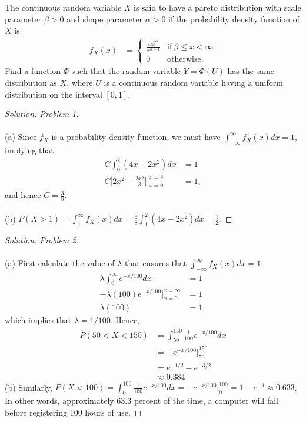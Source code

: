 \documentclass[10pt]{article}
\newenvironment{problem}[2][Problem]{\begin{trivlist}
\item[\hskip \labelsep {\bfseries #1}\hskip \labelsep {\bfseries #2.}]}{\end{trivlist}}
\begin{document}
\begin{problem}{10}
The continuous random variable $X$ is said to have a pareto distribution with scale parameter $\beta > 0$ and shape parameter $\alpha > 0$ if the probability density function of $X$ is
\begin{align*}
    f_X(x) &= 
    \begin{cases}
      \frac{\alpha \beta^\alpha}{x^{\alpha+1}} & \text{if}\ \beta \leq x < \infty \\
      0 & \text{otherwise.}
    \end{cases}
\end{align*}
Find a function $\Phi$ such that the random variable $Y = \Phi(U)$ has the same distribution as $X$, where $U$ is a continuous random variable having a uniform distribution on the interval $[0,1]$.
\end{problem}


\newpage

\begin{proof}[Solution: Problem 1]
\text{}\\
\text{}\\
(a) Since $f_X$ is a probability density function, we must have $\int_{-\infty}^\infty f_X(x) dx = 1$, implying that
\begin{align*}
C \int_0^2 (4x-2x^2) dx &= 1\\
C\bigg[2x^2 -\frac{2x^3}{3}\bigg]\bigg|^{x=2}_{x=0} &=  1,
\end{align*}
and hence $C =  \frac{3}{8}$.\\
\text{}\\
(b) $P(X > 1) = \int_1^\infty f_X(x) dx  = \frac{3}{8} \int_1^2 (4x-2x^2) dx = \frac{1}{2}$.
\end{proof}

\vspace{0.2cm}
\begin{proof}[Solution: Problem 2]
\text{}\\
\text{}\\
(a) First calculate the value of $\lambda$ that ensures that $\int_{-\infty}^\infty f_X(x) dx = 1$:
\begin{align*}
\lambda \int_0^\infty e^{-x/100}dx &=  1\\
-\lambda(100)e^{-x/100} \bigg|^{x=\infty}_{x=0}  &=  1\\
\lambda(100)  &=  1,
\end{align*}
which implies that $\lambda = 1/100$. Hence, 
\begin{align*}
P(50 < X < 150) &= \int_{50}^{150} \frac{1}{100}e^{-x/100}dx\\
&=-e^{-x/100}\bigg|_{50}^{150}\\
&=e^{-1/2} - e^{-3/2}\\
&\approx 0.384
\end{align*}
(b) Similarly, $P(X < 100) = \int_{0}^{100} \frac{1}{100}e^{-x/100}dx = -e^{-x/100}\bigg|_{0}^{100} =1 -e^{-1} \approx 0.633$. In other words, approximately 63.3 percent of the time, a computer will fail before registering 100 hours of use.
\end{proof}
\end{document}
